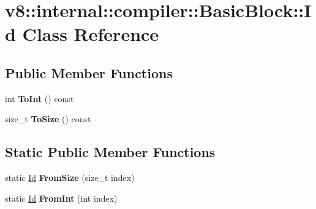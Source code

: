 \hypertarget{classv8_1_1internal_1_1compiler_1_1_basic_block_1_1_id}{}\section{v8\+:\+:internal\+:\+:compiler\+:\+:Basic\+Block\+:\+:Id Class Reference}
\label{classv8_1_1internal_1_1compiler_1_1_basic_block_1_1_id}
\subsection*{Public Member Functions}
\begin{DoxyCompactItemize}
\item 
int {\bfseries To\+Int} () const \hypertarget{classv8_1_1internal_1_1compiler_1_1_basic_block_1_1_id_af339e33293c18e48106f745ca4500daf}{}\label{classv8_1_1internal_1_1compiler_1_1_basic_block_1_1_id_af339e33293c18e48106f745ca4500daf}

\item 
size\+\_\+t {\bfseries To\+Size} () const \hypertarget{classv8_1_1internal_1_1compiler_1_1_basic_block_1_1_id_a93295c6be8af8b0ae4a88287f2879250}{}\label{classv8_1_1internal_1_1compiler_1_1_basic_block_1_1_id_a93295c6be8af8b0ae4a88287f2879250}

\end{DoxyCompactItemize}
\subsection*{Static Public Member Functions}
\begin{DoxyCompactItemize}
\item 
static \hyperlink{classv8_1_1internal_1_1compiler_1_1_basic_block_1_1_id}{Id} {\bfseries From\+Size} (size\+\_\+t index)\hypertarget{classv8_1_1internal_1_1compiler_1_1_basic_block_1_1_id_a4f106f6bd5dc4347eab0179ad5a703df}{}\label{classv8_1_1internal_1_1compiler_1_1_basic_block_1_1_id_a4f106f6bd5dc4347eab0179ad5a703df}

\item 
static \hyperlink{classv8_1_1internal_1_1compiler_1_1_basic_block_1_1_id}{Id} {\bfseries From\+Int} (int index)\hypertarget{classv8_1_1internal_1_1compiler_1_1_basic_block_1_1_id_a8e465370cd1b216b46c84a5bb42f4f97}{}\label{classv8_1_1internal_1_1compiler_1_1_basic_block_1_1_id_a8e465370cd1b216b46c84a5bb42f4f97}

\end{DoxyCompactItemize}
